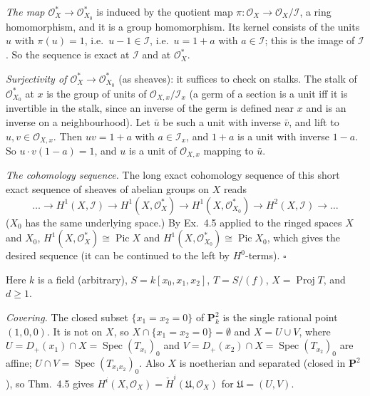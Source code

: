 \documentclass[11pt]{article}
\begin{document}
\emph{The map $\mathcal O_X^*\to\mathcal O_{X_0}^*$} is induced by the quotient map $\pi:\mathcal O_X\to\mathcal O_X/\mathcal I$, a ring homomorphism, and it is a group homomorphism. Its kernel consists of the units $u$ with $\pi(u)=1$, i.e.\ $u-1\in\mathcal I$, i.e.\ $u=1+a$ with $a\in\mathcal I$; this is the image of $\mathcal I$. So the sequence is exact at $\mathcal I$ and at $\mathcal O_X^*$.

\emph{Surjectivity of $\mathcal O_X^*\to\mathcal O_{X_0}^*$} (as sheaves): it suffices to check on stalks. The stalk of $\mathcal O_{X_0}^*$ at $x$ is the group of units of $\mathcal O_{X,x}/\mathcal I_x$ (a germ of a section is a unit iff it is invertible in the stalk, since an inverse of the germ is defined near $x$ and is an inverse on a neighbourhood). Let $\bar u$ be such a unit with inverse $\bar v$, and lift to $u,v\in\mathcal O_{X,x}$. Then $uv=1+a$ with $a\in\mathcal I_x$, and $1+a$ is a unit with inverse $1-a$. So $u\cdot v(1-a)=1$, and $u$ is a unit of $\mathcal O_{X,x}$ mapping to $\bar u$.

\emph{The cohomology sequence.} The long exact cohomology sequence of this short exact sequence of sheaves of abelian groups on $X$ reads
\[
\dots\to H^1(X,\mathcal I)\to H^1(X,\mathcal O_X^*)\to H^1(X,\mathcal O_{X_0}^*)\to H^2(X,\mathcal I)\to\dots
\]
($X_0$ has the same underlying space.) By Ex.~4.5 applied to the ringed spaces $X$ and $X_0$, $H^1(X,\mathcal O_X^*)\cong\operatorname{Pic}X$ and $H^1(X,\mathcal O_{X_0}^*)\cong\operatorname{Pic}X_0$, which gives the desired sequence (it can be continued to the left by $H^0$-terms). \hfill$\square$

\pf
Here $k$ is a field (arbitrary), $S=k[x_0,x_1,x_2]$, $T=S/(f)$, $X=\operatorname{Proj}T$, and $d\ge1$.

\emph{Covering.} The closed subset $\{x_1=x_2=0\}$ of $\mathbf P^2_k$ is the single rational point $(1,0,0)$. It is not on $X$, so $X\cap\{x_1=x_2=0\}=\emptyset$ and $X=U\cup V$, where $U=D_+(x_1)\cap X=\operatorname{Spec}(T_{x_1})_0$ and $V=D_+(x_2)\cap X=\operatorname{Spec}(T_{x_2})_0$ are affine; $U\cap V=\operatorname{Spec}(T_{x_1x_2})_0$. Also $X$ is noetherian and separated (closed in $\mathbf P^2$), so Thm.~4.5 gives $H^i(X,\mathcal O_X)=\check H^i(\mathfrak U,\mathcal O_X)$ for $\mathfrak U=(U,V)$.
\end{document}

